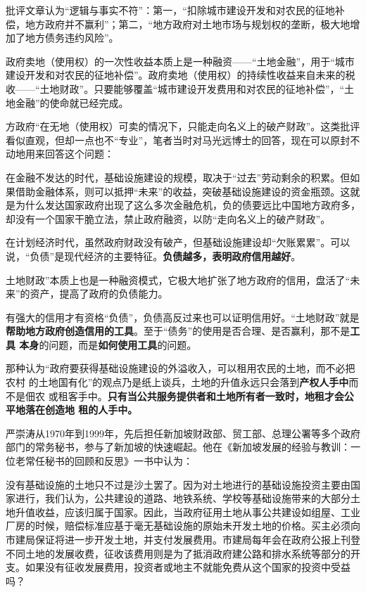 批评文章认为“逻辑与事实不符”：第一，“扣除城市建设开发和对农民的征地补偿，地方政府并不赢利”；第二，“地方政府对土地市场与规划权的垄断，极大地增加了地方债务违约风险”。

政府卖地（使用权）的一次性收益本质上是一种融资——“土地金融”，用于“城市建设开发和对农民的征地补偿”。政府卖地（使用权）的持续性收益来自未来的税收——“土地财政”。只要能够覆盖“城市建设开发费用和对农民的征地补偿”，“土地金融”的使命就已经完成。

方政府“在无地（使用权）可卖的情况下，只能走向名义上的破产财政”。这类批评看似直观，但却一点也不“专业”，笔者当时对马光远博士的回答，现在可以原封不动地用来回答这个问题：

在金融不发达的时代，基础设施建设的规模，取决于“过去”劳动剩余的积累。但如果借助金融体系，则可以抵押“未来”的收益，突破基础设施建设的资金瓶颈。这就是为什么发达国家政府出现了这么多次金融危机，负的债要远比中国地方政府多，却没有一个国家干脆立法，禁止政府融资，以防“走向名义上的破产财政”。

在计划经济时代，虽然政府财政没有破产，但基础设施建设却“欠账累累”。可以说，“负债”是现代经济的主要特征。\textbf{负债越多，表明政府信用越好}。

土地财政”本质上也是一种融资模式，它极大地扩张了地方政府的信用，盘活了“未来”的资产，提高了政府的负债能力。

有强大的信用才有资格“负债”，负债高反过来也可以证明信用好。“土地财政”就是
\textbf{帮助地方政府创造信用的工具}。至于“债务”的使用是否合理、是否赢利，那不是\textbf{工具
本身}的问题，而是\textbf{如何使用工具}的问题。


那种认为“政府要获得基础设施建设的外溢收入，可以租用农民的土地，而不必把农村
的土地国有化”的观点乃是纸上谈兵，土地的升值永远只会落到\textbf{产权人手中}而不是佃农
或租客手中。\textbf{只有当公共服务提供者和土地所有者一致时，地租才会公平地落在创造地
租的人手中。}

严崇涛从1970年到1999年，先后担任新加坡财政部、贸工部、总理公署等多个政府部门的常务秘书，参与了新加坡的快速崛起。他在《新加坡发展的经验与教训：一位老常任秘书的回顾和反思》一书中认为：

没有基础设施的土地只不过是沙土罢了。因为对土地进行的基础设施投资主要由国家进行，我们认为，公共建设的道路、地铁系统、学校等基础设施带来的大部分土地升值收益，应该归属于国家。因此，当政府征用土地从事公共建设如组屋、工业厂房的时候，赔偿标准应基于毫无基础设施的原始未开发土地的价格。买主必须向市建局保证将进一步开发土地，并支付发展费用。市建局每年会在政府公报上刊登不同土地的发展收费，征收该费用则是为了抵消政府建公路和排水系统等部分的开支。如果没有征收发展费用，投资者或地主不就能免费从这个国家的投资中受益吗？

